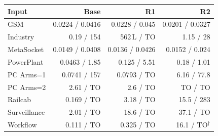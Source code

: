 \begin{tabular}{@{}lrrr@{}}\toprule
Input & Base & R1 & R2\\\midrule
GSM & 0.0224 / 0.0416 & 0.0228 / 0.045 & 0.0201 / 0.0327\\
Industry & 0.19 / 154 & 562\,L / TO & 1.15 / 28\\
MetaSocket & 0.0149 / 0.0408 & 0.0136 / 0.0426 & 0.0152 / 0.024\\
PowerPlant & 0.0463 / 1.85 & 0.125 / 5.51 & 0.18 / 1.01\\
PC Arms=1 & 0.0741 / 157 & 0.0793 / TO & 6.16 / 77.8\\
PC Arms=2 & 2.61 / TO & 2.6 / TO & TO / TO\\
Railcab & 0.169 / TO & 3.18 / TO & 15.5 / 283\\
Surveillance & 2.01 / TO & 18.6 / TO & 37.1 / TO\\
Workflow & 0.111 / TO & 0.325 / TO & 16.1 / TO$^{\dagger}$\\
\bottomrule\end{tabular}
\par{}

